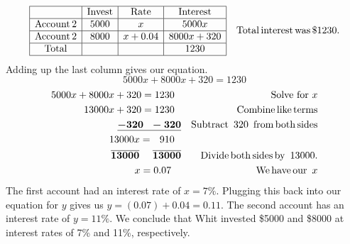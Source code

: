 \begin{example}
\begin{eqnarray*}
    &  & \\
    \begin{array}{|c|c|c|c|}
      \hline
      & \tmop{Invest} & \tmop{Rate} & \tmop{Interest}\\
      \hline
      \tmop{Account} 2 & 5000 & x & 5000 x\\
      \hline
      \tmop{Account} 2 & 8000 & x + 0.04 & 8000 x + 320\\
      \hline
      \tmop{Total} &  &  & 1230\\
      \hline
    \end{array} &  & \tmop{Total} \tmop{interest} \tmop{was} \$1230.%
		\end{eqnarray*}
Adding up the last column gives our equation.
$$5000 x + 8000 x + 320 = 1230$$
		\begin{eqnarray*}
		5000 x + 8000 x + 320 = 1230~~ &  & \text{Solve~for~} x\\
    13000 x + 320 = 1230~~ &  & \operatorname{Combine} \operatorname{like} \operatorname{terms}\\
    \boldsymbol{\underline{- 320 ~~- 320}} &  & \operatorname{Subtract~} 320 \operatorname{~from} \operatorname{both}
    \operatorname{sides}\\
    13000 x = ~~910~~ &  &\\
    \boldsymbol{\overline{13000} ~~~~ \overline{13000}} &  &  \operatorname{Divide} \operatorname{both} \operatorname{sides} \operatorname{by~} 13000.\\
    x = 0.07~~~ &  & \operatorname{We} \operatorname{have} \operatorname{our~} x\\
		\end{eqnarray*}
		The first account had an interest rate of $x=7\%$.  Plugging this back into our equation for $y$ gives us $y=(0.07) + 0.04=0.11$.  The second account has an interest rate of $y=11\%$.\pp
		We conclude that Whit invested \$5000 and \$8000 at interest rates of 7\% and 11\%, respectively.
\end{example}

